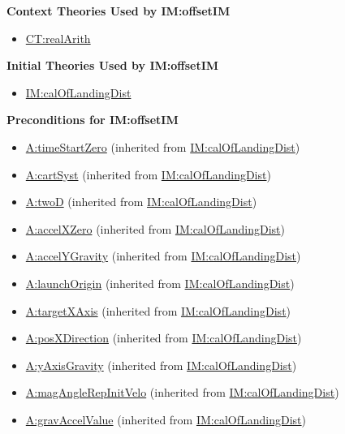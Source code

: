 \documentclass[12pt]{article}
\begin{document}
\noindent \textbf{Context Theories Used by IM:offsetIM}

\begin{itemize}
\item \hyperref[CT:realArith]{CT:realArith}
\end{itemize}

\noindent \textbf{Initial Theories Used by IM:offsetIM}

\begin{itemize}
\item \hyperref[IM:calOfLandingDist]{IM:calOfLandingDist}
\end{itemize}

\noindent \textbf{Preconditions for IM:offsetIM}
\begin{itemize}
\item \hyperref[timeStartZero]{A:timeStartZero} (inherited from \hyperref[IM:calOfLandingDist]{IM:calOfLandingDist})
\item \hyperref[cartSyst]{A:cartSyst} (inherited from \hyperref[IM:calOfLandingDist]{IM:calOfLandingDist})
\item \hyperref[twoD]{A:twoD} (inherited from \hyperref[IM:calOfLandingDist]{IM:calOfLandingDist})
\item \hyperref[accelXZero]{A:accelXZero} (inherited from \hyperref[IM:calOfLandingDist]{IM:calOfLandingDist})
\item \hyperref[accelYGravity]{A:accelYGravity} (inherited from \hyperref[IM:calOfLandingDist]{IM:calOfLandingDist})
\item \hyperref[launchOrigin]{A:launchOrigin} (inherited from \hyperref[IM:calOfLandingDist]{IM:calOfLandingDist})
\item \hyperref[targetXAxis]{A:targetXAxis} (inherited from \hyperref[IM:calOfLandingDist]{IM:calOfLandingDist})
\item \hyperref[posXDirection]{A:posXDirection} (inherited from \hyperref[IM:calOfLandingDist]{IM:calOfLandingDist})
\item \hyperref[yAxisGravity]{A:yAxisGravity} (inherited from \hyperref[PIM:calOfLandingDist]{IM:calOfLandingDist})
\item \hyperref[magAngleRepInitVelo]{A:magAngleRepInitVelo} (inherited from \hyperref[IM:calOfLandingDist]{IM:calOfLandingDist})
\item \hyperref[gravAccelValue]{A:gravAccelValue} (inherited from \hyperref[IM:calOfLandingDist]{IM:calOfLandingDist})

\end{itemize}
\end{document}
